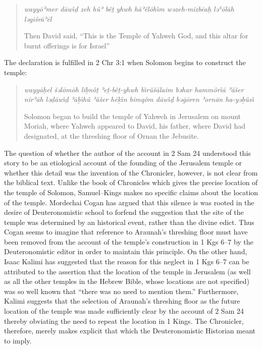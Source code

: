 \begin{quote}
\emph{wayyōʾmer dāwı̂ḏ zeh hûʾ bêṯ yhwh hāʾĕlōhı̂m wəzeh-mizbēaḥ ləʿōlāh
ləyiśrāʾēl}

Then David said, ``This is the Temple of Yahweh God, and this altar for
burnt offerings is for Israel''
\end{quote}

The declaration is fulfilled in 2 Chr 3:1 when Solomon begins to
construct the temple:

\begin{quote}
\emph{wayyāḥel šəlōmōh liḇnôṯ ʾeṯ-bêṯ-yhwh bı̂rûšālaim bəhar hammôrı̂ā
ʾăšer nirʾāh ləḏāwı̂ḏ ʾāḇı̂hû ʾăšer hēḵı̂n bimqôm dāwı̂ḏ bəḡōren ʾornān
ha-yəḇûsı̂}

Solomon began to build the temple of Yahweh in Jerusalem on mount
Moriah, where Yahweh appeared to David, his father, where David had
designated, at the threshing floor of Ornan the Jebusite.
\end{quote}

The question of whether the author of the account in 2 Sam 24 understood
this story to be an etiological account of the founding of the Jerusalem
temple or whether this detail was the invention of the Chronicler,
however, is not clear from the biblical text. Unlike the book of
Chronicles which gives the precise location of the temple of Solomon,
Samuel--Kings makes no specific claims about the location of the temple.
Mordechai Cogan has argued that this silence is was rooted in the desire
of Deuteronomistic school to forfend the suggestion that the site of the
temple was determined by an historical event, rather than the divine
edict.\autocite[307]{cogan_tarbiz1986} Thus Cogan seems to imagine that
reference to Araunah's threshing floor must have been removed from the
account of the temple's construction in 1 Kgs 6--7 by the
Deuteronomistic editor in order to maintain this
principle.\autocite[307]{cogan_tarbiz1986} On the other hand, Isaac
Kalimi has suggested that the reason for this neglect in 1 Kgs 6--7 can
be attributed to the assertion that the location of the temple in
Jerusalem (as well as all the other temples in the Hebrew Bible, whose
locations are not specified) was so well known that ``there was no need
to mention them.''\autocite[I would, however, make the observation that,
depending on how one dates the account in 1 Kng 6--7, it may be the case
that an \emph{exilic} author genuinely did not know the precise location
of the temple. However, Kalimi also points out that other ANE temple
building texts often neglect to specify the precise location of their
subjects. On this point, I would also hasten to add that monumental
inscriptions should be treated separately, since the location of the
inscription, ostensibly, \emph{would be} the location of the
temple.][355--356]{kalimi_htr1990} Furthermore, Kalimi suggests that the
selection of Araunah's threshing floor as the future location of the
temple was made sufficiently clear by the account of 2 Sam 24 thereby
obviating the need to repeat the location in 1
Kings.\autocite[357]{kalimi_htr1990} The Chronicler, therefore, merely
makes explicit that which the Deuteronomistic Historian meant to imply.

